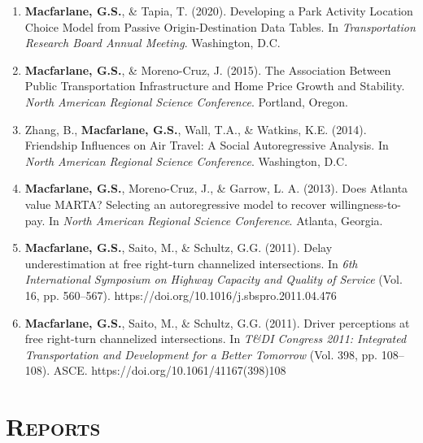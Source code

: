 \documentclass[margin,line]{res}
\newif\ifdetail
\newcounter{enuminitialize}
\newenvironment{myenum}[1][]
{%
 \setcounter{enuminitialize}{#1}
 \addtocounter{enuminitialize}{2}
 \begin{enumerate}[left= 4pt, itemsep=12pt, start=\value{enuminitialize}, label=\arabic*\addtocounter{enumi}{-2}]
}
{%
 \end{enumerate}
}
\newcommand{\secfont}{\scshape }
\begin{document}
\begin{resume}
\begin{myenum}[10]
\item \textbf{Macfarlane, G.S.}, \& Tapia, T. (2020). Developing a Park Activity Location Choice Model from Passive Origin-Destination Data Tables. In \textit{ Transportation Research Board Annual Meeting}. Washington, D.C.

\item \textbf{Macfarlane, G.S.}, \& Moreno-Cruz, J. (2015). The Association Between Public Transportation Infrastructure and Home Price Growth and Stability. \textit{North American Regional Science Conference}. Portland, Oregon.

\item Zhang, B., \textbf{Macfarlane, G.S.}, Wall, T.A., \& Watkins, K.E. (2014). Friendship Influences on Air Travel: A Social Autoregressive Analysis. In \textit{ North American Regional Science Conference}. Washington, D.C.

\item \textbf{Macfarlane, G.S.}, Moreno-Cruz, J., \& Garrow, L. A. (2013). Does Atlanta value MARTA? Selecting an autoregressive model to recover willingness-to-pay. In \textit{ North American Regional Science Conference}. Atlanta, Georgia.

\item \textbf{Macfarlane, G.S.}, Saito, M., \& Schultz, G.G. (2011). Delay underestimation at free right-turn channelized intersections. In \textit{ 6th International Symposium on Highway Capacity and Quality of Service} (Vol. 16, pp. 560–567). https://doi.org/10.1016/j.sbspro.2011.04.476 \ifdetail Citations: 6  \fi

\item \textbf{Macfarlane, G.S.}, Saito, M., \& Schultz, G.G. (2011). Driver perceptions at free right-turn channelized intersections. In \textit{ T\&DI Congress 2011: Integrated Transportation and Development for a Better Tomorrow} (Vol. 398, pp. 108–108). ASCE. https://doi.org/10.1061/41167(398)108 \ifdetail Citations: 3  \fi
\end{myenum}


\noindent\makebox[\linewidth]{\rule{\linewidth}{0.4pt}}
\section{\secfont Reports}
\ifdetail These are technical reports completed under contract for the sponsoring agency;
each report was reviewed by a technical advisory committee prior to publication. Item 1 resulted from postdoctoral activities at Georgia Tech, items 2 and 3 from my consulting practice, and items 4 through 9 from my work since joining BYU.\fi
\vspace{0.3cm}
\begin{myenum}[9]


\end{myenum}
\end{resume}
\end{document}
